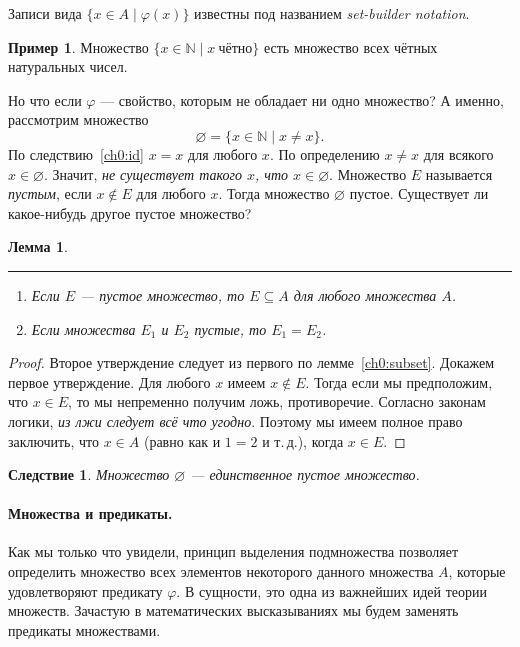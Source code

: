 \documentclass[12pt,notitlepage]{article}
\theoremstyle{plain}
\newtheorem{lemma}[thm]{Лемма}
\newtheorem{corr}[thm]{Следствие}
\theoremstyle{definition}
\newtheorem{exm}[thm]{Пример}
\theoremstyle{plain}
\newcommand{\N}{\mathbb{N}}
\newcommand{\sbs}{\subseteq}
\newcommand{\void}{\varnothing}
\renewcommand{\phi}{\varphi}
\newcommand{\1}{\mathbf{1}}
\newcommand{\0}{\mathbf{0}}
\begin{document}
Записи вида $\{x \in A \mid \phi(x)\}$ известны под названием \emph{set-builder notation}.

\begin{exm}
	Множество
	$\{ x \in \N \mid x\ \mbox{чётно} \}$
	есть множество всех чётных натуральных чисел.
\end{exm}

Но что если $\phi$ --- свойство, которым не обладает ни одно множество? А именно, рассмотрим множество
$$\void = \{ x \in \N \mid x \neq x \}.$$
По следствию~\ref{ch0:id} $x = x$ для любого $x$. По определению $x \neq x$ для всякого $x \in \void$. Значит, \emph{не существует такого $x$, что $x \in \void$}. Множество $E$ называется \emph{пустым}, если $x \notin E$ для любого $x$. Тогда множество $\void$ пустое. Существует ли какое-нибудь другое пустое множество?
\begin{lemma}\label{ch0:empty}\rule{1pt}{0pt}
	\begin{enumerate}
		\item Если $E$ --- пустое множество, то $E \sbs A$ для любого множества $A$.
		\item Если множества $E_1$ и $E_2$ пустые, то $E_1 = E_2$.
	\end{enumerate}
\end{lemma} 
\begin{proof}
	Второе утверждение следует из первого по лемме~\ref{ch0:subset}. Докажем первое утверждение. Для любого $x$ имеем $x \notin E$. Тогда если мы предположим, что $x \in E$, то мы непременно получим ложь, противоречие. Согласно законам логики, \emph{из лжи следует всё что угодно}. Поэтому мы имеем полное право заключить, что $x \in A$ (равно как и $1 = 2$ и т.\,д.), когда $x \in E$.
\end{proof}
\begin{corr}
	Множество $\void$ --- единственное пустое множество.
\end{corr}

\paragraph{Множества и предикаты.}
Как мы только что увидели, принцип выделения подмножества позволяет определить множество всех элементов некоторого данного множества $A$, которые удовлетворяют предикату $\phi$. В сущности, это одна из важнейших идей теории множеств. Зачастую в математических высказываниях мы будем заменять предикаты множествами.
\end{document}
